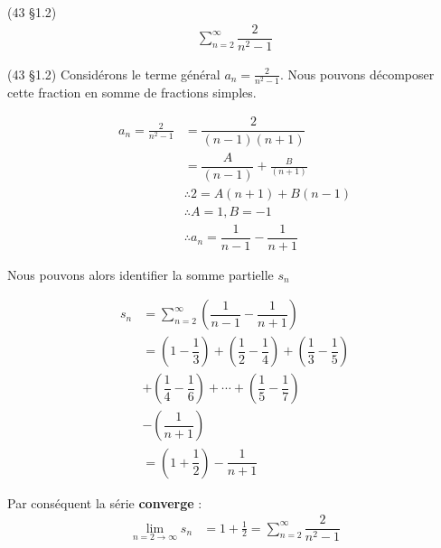 \documentclass{report}
\begin{document}
\begin{multicols*}{3}
        \begin{Exercice}{(43 \S 1.2)}{}
            \begin{align*}
                \sum_{n=2}^{\infty}\dfrac{2}{n^2 - 1}
            \end{align*}    
        \end{Exercice}


        \begin{Reponse}{(43 \S 1.2)}{}
           Considérons le terme général 
           $a_n = \frac{2}{n^2 -1} $. Nous pouvons décomposer cette 
           fraction en somme de fractions simples. 

           \begin{align*}
               a_n = \frac{2}{n^2 -1} &= 
               \dfrac{2}{(n-1)(n+1)}  \\ 
                                    &=
               \dfrac{A}{(n-1)}  + \frac{B}{(n+1)} \\ 
                                    & \therefore
                2 = A(n+1) + B(n-1) \\ 
                                    & \therefore 
                A = 1, B = - 1 \\ 
                                    & \therefore
                a_n = \dfrac{1}{n-1} - \dfrac{1}{n+1}
           \end{align*}

           Nous pouvons alors identifier la somme partielle $s_n$ 

           \begin{align*}
                s_n &= \sum_{n=2}^{\infty }\left( 
                \dfrac{1}{n-1} - \dfrac{1}{n+1} \right) \\ 
                   &= 
                \left( 1  - \dfrac{1}{3}  \right) + 
                \left( \dfrac{1}{2} - \dfrac{1}{4} \right) + 
                \left( \dfrac{1}{3} - \dfrac{1}{5} \right)  
                 \\
                   &+\left( \dfrac{1}{4} - \dfrac{1}{6} \right)
                   +\cdots + \left( \dfrac{1}{5} - \dfrac{1}{7} \right)
                   \\ 
                   &- \left(\dfrac{1}{n+1} \right) \\
                   &=
                   \left(1 + \dfrac{1}{2} \right ) - \dfrac{1}{n+1}
           \end{align*} 

           Par conséquent la série 
           \textbf{converge} :
           \begin{align*}
               \lim\limits_{n=2\to\infty }s_n &= 
                   1 + \frac{1}{2} = 
                   \sum_{n=2}^{\infty}\dfrac{2}{n^2 -1} 
           \end{align*}
        \end{Reponse}


\end{multicols*}
\end{document}
